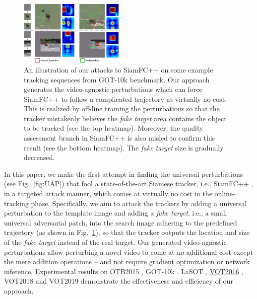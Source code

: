 \documentclass[journal]{IEEEtran}
\newcommand{\ie}{i.e.}
\begin{document}
\begin{figure}[t]
  \centering
  \includegraphics[width=0.45\textwidth]{images_imperceptible/1_v8.pdf}
  \caption{An illustration of our attacks to SiamFC++ on some example tracking sequences from GOT-10k benchmark. Our approach generates the video-agnostic perturbations which can force SiamFC++ to follow a complicated trajectory at virtually no cost. This is realized by off-line training the perturbations so that the tracker mistakenly believes the \textit{fake target} area contains the object to be tracked (see the top heatmap). Moreover, the quality assessment branch in SiamFC++ is also misled to confirm this result (see the bottom heatmap). The \textit{fake target} size is gradually decreased.} 
  \label{fig:1}
  \vspace{-5mm}
\end{figure}
  
In this paper, we make the first attempt in finding the universal perturbations (see Fig.~\ref{fig:UAP}) that fool a state-of-the-art Siamese tracker, \ie, SiamFC++ \cite{SiamFC++}, in a targeted attack manner, which comes at virtually no cost in the online-tracking phase. Specifically, we aim to attack the trackers by adding a universal perturbation to the template image and adding a \textit{fake target}, \ie, a small universal adversarial patch, into the search image adhering to the predefined trajectory (as shown in Fig.~\ref{fig:1}), so that the tracker outputs the location and size of the \textit{fake target} instead of the real target. Our generated video-agnostic perturbations allow perturbing a novel video to come at no additional cost except the mere addition operations -- and not require gradient optimization or network inference. Experimental results on OTB2015 \cite{OTB}, GOT-10k \cite{GOT-10k}, LaSOT \uline{\cite{LaSOT}}, \uline{VOT2016} \cite{VOT2016}, VOT2018 \cite{VOT2018} and VOT2019 \cite{VOT2019} demonstrate the effectiveness and efficiency of our approach.
\end{document}
